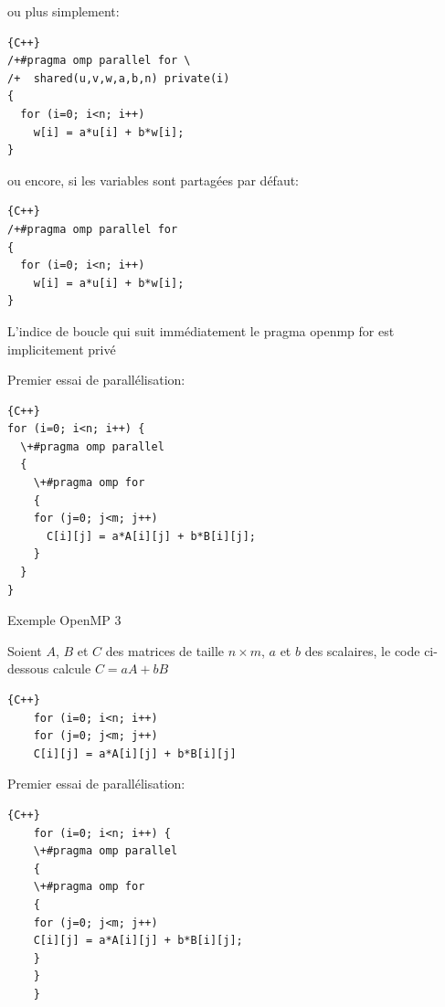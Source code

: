\documentclass{beamer}
\begin{document}
\begin{frame}[fragile]
ou plus simplement:

\begin{lstlisting}{C++}
/+#pragma omp parallel for \
/+  shared(u,v,w,a,b,n) private(i)
{
  for (i=0; i<n; i++)
    w[i] = a*u[i] + b*w[i];
}
\end{lstlisting}

ou encore, si les variables sont partagées par défaut:
\begin{lstlisting}{C++}
/+#pragma omp parallel for
{
  for (i=0; i<n; i++)
    w[i] = a*u[i] + b*w[i];
}
\end{lstlisting}

L'indice de boucle qui suit immédiatement le pragma openmp for est implicitement privé
\end{frame}

\begin{frame}[fragile]
	
	Premier essai de parallélisation:
	
\begin{lstlisting}{C++}
for (i=0; i<n; i++) {
  \+#pragma omp parallel
  {
    \+#pragma omp for
    {
    for (j=0; j<m; j++)
      C[i][j] = a*A[i][j] + b*B[i][j];
    }
  }
}
\end{lstlisting}
	
\end{frame}


\begin{frame}[fragile]
	Exemple OpenMP 3
	
	\vfill	
	
	Soient $A$, $B$ et $C$ des matrices de taille $n \times m$, $a$ et $b$ des scalaires, le code ci-dessous calcule $C = a A + b B$
	\vfill
	\begin{lstlisting}{C++}
	for (i=0; i<n; i++)
	for (j=0; j<m; j++)
	C[i][j] = a*A[i][j] + b*B[i][j]
	\end{lstlisting}
	
\end{frame}

\begin{frame}[fragile]
	
	Premier essai de parallélisation:
	
	\begin{lstlisting}{C++}
	for (i=0; i<n; i++) {
	\+#pragma omp parallel
	{
	\+#pragma omp for
	{
	for (j=0; j<m; j++)
	C[i][j] = a*A[i][j] + b*B[i][j];
	}
	}
	}
	\end{lstlisting}
	
\end{frame}

\begin{frame}
\end{frame}

\begin{frame}
\end{frame}
\end{document}
